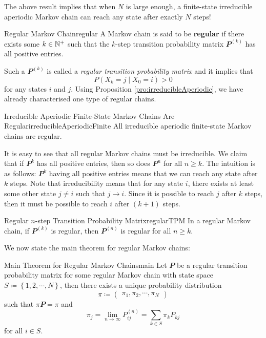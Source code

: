 \documentclass[math, code]{amznotes}
\theoremstyle{remark}
\begin{document}
The above result implies that when $N$ is large enough, a finite-state irreducible aperiodic Markov chain can reach any state after exactly $N$ steps!
\begin{dfnbox}{Regular Markov Chain}{regular}
    A Markov chain is said to be {\color{red} \textbf{regular}} if there exists some $k \in \mathbb{N}^+$ such that the $k$-step transition probability matrix $\mathbfit{P}^{\left(k\right)}$ has all positive entries.
\end{dfnbox}
Such a $\mathbfit{P}^{\left(k\right)}$ is called a \textit{regular transition probability matrix} and it implies that 
\begin{equation*}
    P\left(X_k = j \mid X_0 = i\right) > 0
\end{equation*}
for any states $i$ and $j$. Using Proposition \ref{pro:irreducibleAperiodic}, we have already characterised one type of regular chains.
\begin{probox}{\small Irreducible Aperiodic Finite-State Markov Chains Are Regular}{irreducibleAperiodicFinite}
    All irreducible aperiodic finite-state Markov chains are regular.
\end{probox}
It is easy to see that all regular Markov chains must be irreducible. We claim that if $\mathbfit{P}^k$ has all positive entries, then so does $\mathbfit{P}^{n}$ for all $n \geq k$. The intuition is as follows: $\mathbfit{P}^k$ having all positive entries means that we can reach any state after $k$ steps. Note that irreducibility means that for any state $i$, there exists at least some other state $j \neq i$ such that $j \to i$. Since it is possible to reach $j$ after $k$ steps, then it must be possible to reach $i$ after $\left(k + 1\right)$ steps.
\begin{probox}{Regular $n$-step Transition Probability Matrix}{regularTPM}
    In a regular Markov chain, if $\mathbfit{P}^{\left(k\right)}$ is regular, then $\mathbfit{P}^{\left(n\right)}$ is regular for all $n \geq k$.
\end{probox}
We now state the main theorem for regular Markov chains:
\begin{thmbox}{Main Theorem for Regular Markov Chains}{main}
    Let $\mathbfit{P}$ be a regular transition probability matrix for some regular Markov chain with state space $S \coloneqq \left\{1, 2, \cdots, N\right\}$, then there exists a unique probability distribution 
    \begin{equation*}
        \pi \coloneqq \begin{pmatrix}
            \pi_1, \pi_2, \cdots, \pi_N
        \end{pmatrix}
    \end{equation*}
    such that $\pi\mathbfit{P} = \pi$ and 
    \begin{equation*}
        \pi_j = \lim_{n \to \infty}P^{\left(n\right)}_{ij} = \sum_{k \in S}\pi_kP_{kj}
    \end{equation*}
    for all $i \in S$.
\end{thmbox}
\end{document}
